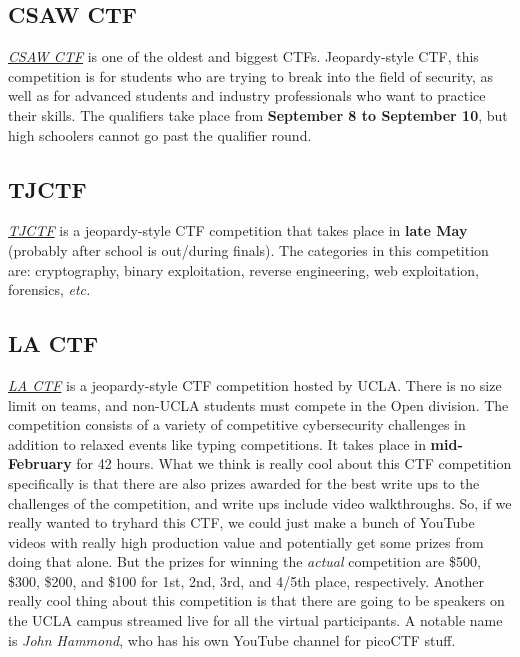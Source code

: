 \documentclass[
  letterpaper,
  DIV=11,
  numbers=noendperiod]{scrartcl}
\begin{document}
\hypertarget{csaw-ctf}{%
\subsection{CSAW CTF}\label{csaw-ctf}}

\href{https://www.csaw.io/ctf}{\emph{CSAW CTF}} is one of the oldest and
biggest CTFs. Jeopardy-style CTF, this competition is for students who
are trying to break into the field of security, as well as for advanced
students and industry professionals who want to practice their skills.
The qualifiers take place from \textbf{September 8 to September 10}, but
high schoolers cannot go past the qualifier round.

\hypertarget{tjctf}{%
\subsection{TJCTF}\label{tjctf}}

\href{https://tjctf.org/}{\emph{TJCTF}} is a jeopardy-style CTF
competition that takes place in \textbf{late May} (probably after school
is out/during finals). The categories in this competition are:
cryptography, binary exploitation, reverse engineering, web
exploitation, forensics, \emph{etc.}

\hypertarget{la-ctf}{%
\subsection{LA CTF}\label{la-ctf}}

\href{https://lactf.uclaacm.com}{\emph{LA CTF}} is a jeopardy-style CTF
competition hosted by UCLA. There is no size limit on teams, and
non-UCLA students must compete in the Open division. The competition
consists of a variety of competitive cybersecurity challenges in
addition to relaxed events like typing competitions. It takes place in
\textbf{mid-February} for 42 hours. What we think is really cool about
this CTF competition specifically is that there are also prizes awarded
for the best write ups to the challenges of the competition, and write
ups include video walkthroughs. So, if we really wanted to tryhard this
CTF, we could just make a bunch of YouTube videos with really high
production value and potentially get some prizes from doing that alone.
But the prizes for winning the \emph{actual} competition are \$500,
\$300, \$200, and \$100 for 1st, 2nd, 3rd, and 4/5th place,
respectively. Another really cool thing about this competition is that
there are going to be speakers on the UCLA campus streamed live for all
the virtual participants. A notable name is \emph{John Hammond}, who has
his own YouTube channel for picoCTF stuff.
\end{document}

